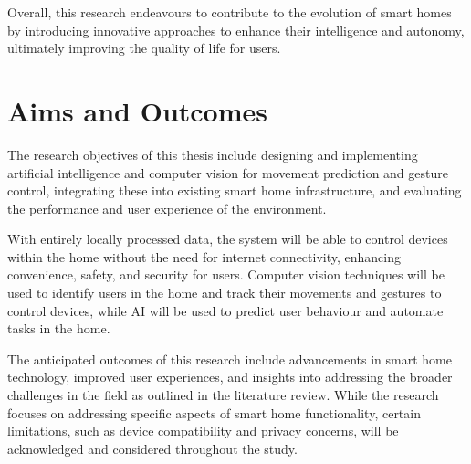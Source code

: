 Overall, this research endeavours to contribute to the evolution of smart homes by introducing innovative approaches to enhance their intelligence and autonomy, ultimately improving the quality of life for users.

\section{Aims and Outcomes}
The research objectives of this thesis include designing and implementing artificial intelligence and computer vision for movement prediction and gesture control, integrating these into existing smart home infrastructure, and evaluating the performance and user experience of the environment.

With entirely locally processed data, the system will be able to control devices within the home without the need for internet connectivity, enhancing convenience, safety, and security for users.
Computer vision techniques will be used to identify users in the home and track their movements and gestures to control devices, while AI will be used to predict user behaviour and automate tasks in the home.

The anticipated outcomes of this research include advancements in smart home technology, improved user experiences, and insights into addressing the broader challenges in the field as outlined in the literature review.
While the research focuses on addressing specific aspects of smart home functionality, certain limitations, such as device compatibility and privacy concerns, will be acknowledged and considered throughout the study.
